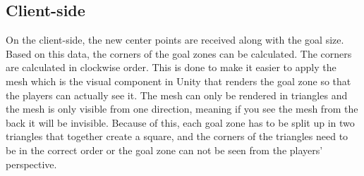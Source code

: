 \subsection{Client-side}
On the client-side, the new center points are received along with the goal size.
Based on this data, the corners of the goal zones can be calculated.
The corners are calculated in clockwise order.
This is done to make it easier to apply the mesh which is the visual component in Unity that renders the goal zone so that the players can actually see it.
The mesh can only be rendered in triangles and the mesh is only visible from one direction, meaning if you see the mesh from the back it will be invisible.
Because of this, each goal zone has to be split up in two triangles that together create a square, and the corners of the triangles need to be in the correct order or the goal zone can not be seen from the players' perspective.
